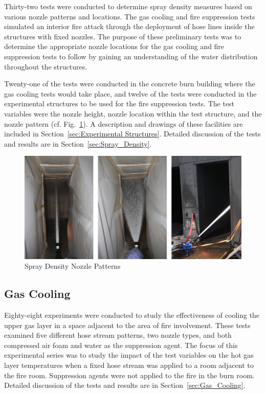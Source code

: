 \documentclass[12pt,oneside]{book}
\begin{document}
Thirty-two tests were conducted to determine spray density measures based on various nozzle patterns and locations. The gas cooling and fire suppression tests simulated an interior fire attack through the deployment of hose lines inside the structures with fixed nozzles. The purpose of these preliminary tests was to determine the appropriate nozzle locations for the gas cooling and fire suppression tests to follow by gaining an understanding of the water distribution throughout the structures.

Twenty-one of the tests were conducted in the concrete burn building where the gas cooling tests would take place, and twelve of the tests were conducted in the experimental structures to be used for the fire suppression tests. The test variables were the nozzle height, nozzle location within the test structure, and the nozzle pattern (cf. Fig.~\ref{fig:Spray_Density_Nozzle_Patterns}). A description and drawings of these facilities are included in Section~\ref{sec:Experimental Structures}. Detailed discussion of the tests and results are in Section~\ref{sec:Spray_Density}.

\begin{figure}[!ht]
	\includegraphics[width=6in]{../Figures/Pictures/Flows}
	\caption{Spray Density Nozzle Patterns}
	\label{fig:Spray_Density_Nozzle_Patterns}
\end{figure}

\subsection{Gas Cooling}
\label{sec:desc_Gas_Cooling}

Eighty-eight experiments were conducted to study the effectiveness of cooling the upper gas layer in a space adjacent to the area of fire involvement. These tests examined five different hose stream patterns, two nozzle types, and both compressed air foam and water as the suppression agent. The focus of this experimental series was to study the impact of the test variables on the hot gas layer temperatures when a fixed hose stream was applied to a room adjacent to the fire room.  Suppression agents were not applied to the fire in the burn room.  Detailed discussion of the tests and results are in Section~\ref{sec:Gas_Cooling}.
\end{document}
